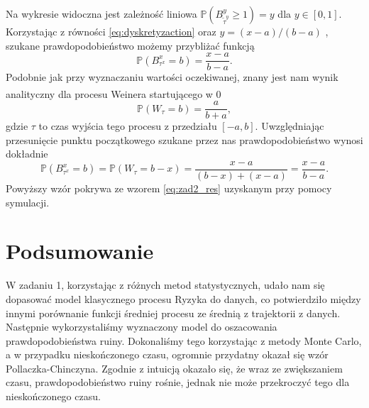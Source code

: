 \documentclass[12pt]{mwart}
\begin{document}
	\noindent Na wykresie widoczna jest zależność liniowa $\mathbb{P}\left(B^y_{\widetilde{\tau}^y}\geqslant1\right) = y$ dla $y\in[0, 1]$. Korzystając z równości \eqref{eq:dyskretyzaction} oraz $y=(x-a)/(b-a)$ , szukane prawdopodobieństwo możemy przybliżać funkcją
	\begin{equation}\label{eq:zad2_res}
		\mathbb{P}\left(B^x_{{\tau}^x}= b\right)=\frac{x-a}{b-a}.
	\end{equation}
	Podobnie jak przy wyznaczaniu wartości oczekiwanej, znany jest nam wynik analityczny\textsuperscript{\cite{art}} dla procesu Weinera startującego w 0
	\begin{equation*}
		\mathbb{P}\left(W_{\tau}=b\right)=\frac{a}{b+a},
	\end{equation*}
	gdzie $\tau$ to czas wyjścia tego procesu z przedziału $[-a, b]$. Uwzględniając przesunięcie punktu początkowego szukane przez nas prawdopodobieństwo wynosi dokładnie
	\begin{equation*}
			\mathbb{P}\left(B^x_{\tau^x}=b\right)=\mathbb{P}\left(W_{\tau}=b-x\right)=\frac{x-a}{(b-x)+(x-a)}=\frac{x-a}{b-a}.
	\end{equation*}
	Powyższy wzór pokrywa ze wzorem \eqref{eq:zad2_res} uzyskanym przy pomocy symulacji.









	
	\section{Podsumowanie}
	\noindent W zadaniu 1, korzystając z różnych metod statystycznych, udało nam się dopasować model klasycznego procesu Ryzyka do danych, co potwierdziło między innymi porównanie funkcji średniej procesu ze średnią z trajektorii z danych. Następnie wykorzystaliśmy wyznaczony model do oszacowania prawdopodobieństwa ruiny. Dokonaliśmy tego korzystając z metody Monte Carlo, a w przypadku nieskończonego czasu, ogromnie przydatny okazał się wzór Pollaczka-Chinczyna. Zgodnie z intuicją okazało się, że wraz ze zwiększaniem czasu, prawdopodobieństwo ruiny rośnie, jednak nie może przekroczyć tego dla nieskończonego czasu.
	
\end{document}

